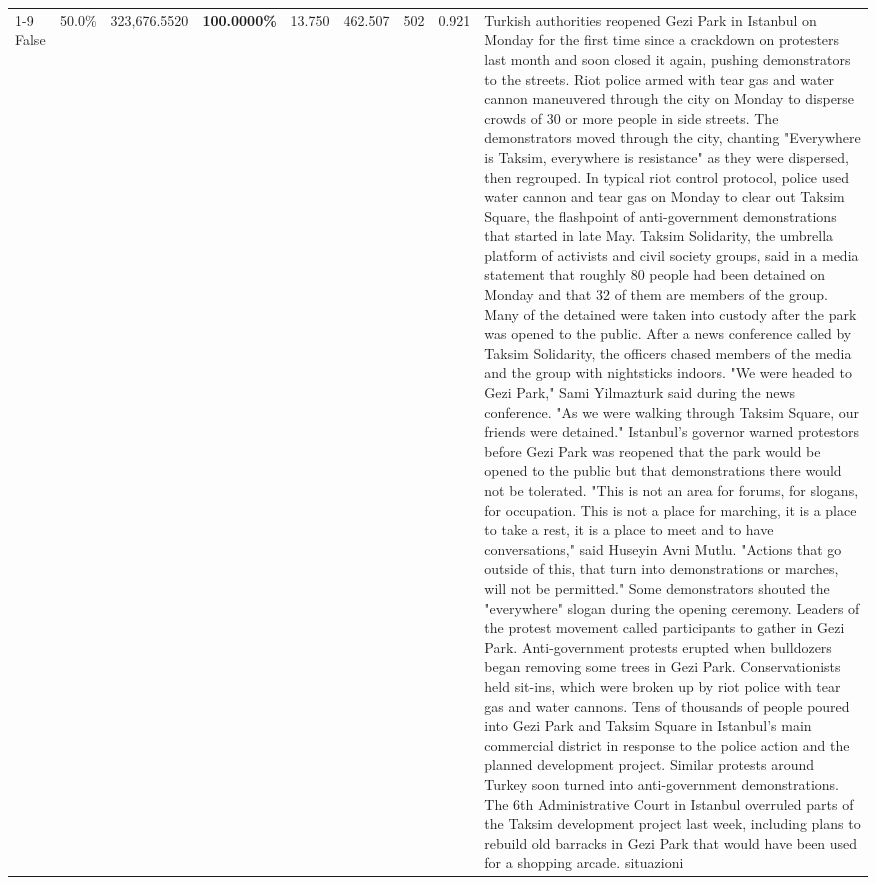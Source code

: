 \begin{table}[H]
\begin{tabular}{lllrlllll}
\cline{1-9}
False & 50.0\% & 323,676.5520 & \bfseries \color{red} 100.0000\% & 13.750 & 462.507 & 502 & 0.921 & Turkish authorities reopened Gezi Park in Istanbul on Monday for the first time since a crackdown on protesters last month and soon closed it again, pushing demonstrators to the streets. Riot police armed with tear gas and water cannon maneuvered through the city on Monday to disperse crowds of 30 or more people in side streets. The demonstrators moved through the city, chanting "Everywhere is Taksim, everywhere is resistance" as they were dispersed, then regrouped. In typical riot control protocol, police used water cannon and tear gas on Monday to clear out Taksim Square, the flashpoint of anti-government demonstrations that started in late May. Taksim Solidarity, the umbrella platform of activists and civil society groups, said in a media statement that roughly 80 people had been detained on Monday and that 32 of them are members of the group. Many of the detained were taken into custody after the park was opened to the public. After a news conference called by Taksim Solidarity, the officers chased members of the media and the group with nightsticks indoors. "We were headed to Gezi Park," Sami Yilmazturk said during the news conference. "As we were walking through Taksim Square, our friends were detained." Istanbul's governor warned protestors before Gezi Park was reopened that the park would be opened to the public but that demonstrations there would not be tolerated. "This is not an area for forums, for slogans, for occupation. This is not a place for marching, it is a place to take a rest, it is a place to meet and to have conversations," said Huseyin Avni Mutlu. "Actions that go outside of this, that turn into demonstrations or marches, will not be permitted." Some demonstrators shouted the "everywhere" slogan during the opening ceremony. Leaders of the protest movement called participants to gather in Gezi Park. Anti-government protests erupted when bulldozers began removing some trees in Gezi Park. Conservationists held sit-ins, which were broken up by riot police with tear gas and water cannons. Tens of thousands of people poured into Gezi Park and Taksim Square in Istanbul's main commercial district in response to the police action and the planned development project. Similar protests around Turkey soon turned into anti-government demonstrations. The 6th Administrative Court in Istanbul overruled parts of the Taksim development project last week, including plans to rebuild old barracks in Gezi Park that would have been used for a shopping arcade. situazioni \\

\end{tabular}
\end{table}

